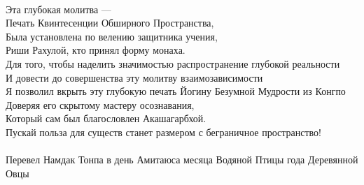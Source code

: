 \\
\ru
Эта глубокая молитва —\\
Печать Квинтесенции Обширного Пространства,\\
Была установлена по велению защитника учения,\\
Риши Рахулой, кто принял форму монаха.\\
Для того, чтобы наделить значимостью распространение глубокой реальности\\
И довести до совершенства эту молитву взаимозависимости\\
Я позволил вкрыть эту глубокую печать Йогину Безумной Мудрости из Конгпо\\
Доверяя его скрытому мастеру осознавания,\\
Который сам был благословлен Акашагарбхой.\\
Пускай польза для существ станет размером с беграничное пространство!\\
\\
\scriptsize Перевел Намдак Тонпа в день Амитаюса месяца Водяной Птицы года Деревянной Овцы\normalsize
